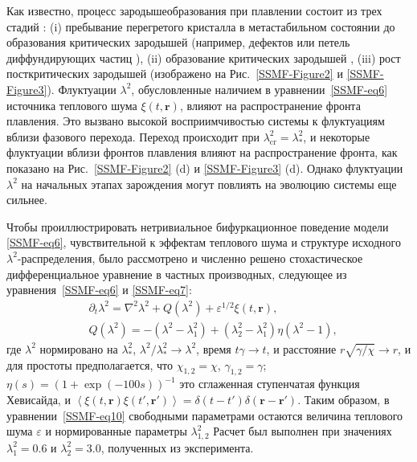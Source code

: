 Как известно, процесс зародышеобразования при плавлении состоит из трех стадий \cite{10.1038/ncomms7942}: (i) пребывание перегретого кристалла в метастабильном состоянии до образования критических зародышей (например, дефектов \cite{10.1038/nmat1375} или петель диффундирующих частиц \cite{10.1103/physrevb.77.134109}), (ii) образование критических зародышей \cite{10.1126/science.1224763, 10.1063/1.2790424, 10.1063/1.2424715},  (iii) рост посткритических зародышей (изображено на Рис.~\ref{SSMF-Figure2} и \ref{SSMF-Figure3}).
Флуктуации $\lambda^2$, обусловленные наличием в уравнении~\eqref{SSMF-eq6} источника теплового шума $\xi(t, \mathbf{r})$, влияют на распространение фронта плавления. Это вызвано высокой восприимчивостью системы к флуктуациям вблизи фазового перехода.
Переход происходит при $\lambda_{\mathrm{cr}}^2=\lambda_\ast^2$,
и некоторые флуктуации вблизи фронтов плавления влияют на распространение фронта, как показано на Рис.~\ref{SSMF-Figure2} (d) и \ref{SSMF-Figure3} (d).
Однако флуктуации $\lambda^2$ на начальных этапах зарождения могут повлиять на эволюцию системы еще сильнее.

Чтобы проиллюстрировать нетривиальное бифуркационное поведение модели \eqref{SSMF-eq6}, чувствительной к эффектам теплового шума и структуре исходного $\lambda^2$-распределения, было рассмотрено и численно решено стохастическое дифференциальное уравнение в частных производных, следующее из уравнения~\eqref{SSMF-eq6} и \eqref{SSMF-eq7}:
\begin{equation}
\label{SSMF-eq10}
\begin{split}
& \partial_t \lambda^2 = \nabla^2\lambda^2 + Q (\lambda^2) +  \varepsilon^{1/2}\xi(t,\mathbf{r}), \\
& Q(\lambda^2) = -(\lambda^2-\lambda_1^2) + (\lambda_2^2-\lambda_1^2)\eta(\lambda^2-1),
\end{split}
\end{equation}
где $\lambda^2$ нормировано на $\lambda_\ast^2$, $\lambda^2/\lambda^2_\ast \rightarrow \lambda^2$,
время $t\gamma \rightarrow t$, и расстояние  $r \sqrt{\gamma/\chi} \rightarrow r$,
и для простоты предполагается, что $\chi_{1,2}=\chi$, $\gamma_{1,2} = \gamma$;
$\eta(s)=(1+\exp(-100 s ))^{-1}$ это сглаженная ступенчатая функция Хевисайда,
и $\left<\xi(t,\mathbf{r})\xi(t',\mathbf{r}')\right>=\delta(t-t')\delta(\mathbf{r}-\mathbf{r'})$.
Таким образом, в уравнении~\eqref{SSMF-eq10} свободными параметрами остаются величина теплового шума $ \varepsilon $ и нормированные параметры $\lambda^2_{1,2}$
Расчет был выполнен при значениях $\lambda_1^2 = 0.6$ и $\lambda_2^2 = 3.0$, полученных из эксперимента.

